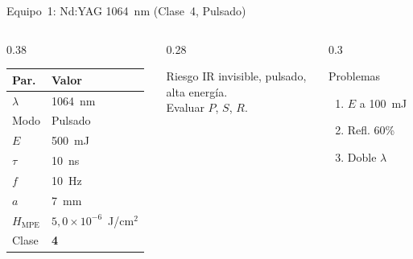 \documentclass[aspectratio=169,12pt]{beamer}
\begin{document}
\begin{frame}{Equipo~1: Nd:YAG 1064~nm (Clase~4, Pulsado)}
	\begin{columns}
		\begin{column}{0.38\textwidth}
			\centering\scriptsize
			\begin{tabular}{ll}
				\toprule
				\textbf{Par.}      & \textbf{Valor}                    \\
				\midrule
				$\lambda$          & 1064~nm                           \\
				Modo               & Pulsado                           \\
				$E$                & 500~mJ                            \\
				$\tau$             & 10~ns                             \\
				$f$                & 10~Hz                             \\
				$a$                & 7~mm                              \\
				$H_{\mathrm{MPE}}$ & $5{,}0\!\times\!10^{-6}$~J/cm$^2$ \\
				\rowcolor{aerored!15}
				Clase              & \textbf{4}                        \\
				\bottomrule
			\end{tabular}
		\end{column}
		\begin{column}{0.28\textwidth}
			\begin{alertblock}{\scriptsize Riesgo}
				\scriptsize
				IR invisible, pulsado,\\
				alta energía.\\
				Evaluar $P$, $S$, $R$.
			\end{alertblock}
		\end{column}
		\begin{column}{0.3\textwidth}
			\begin{exampleblock}{\scriptsize Problemas}
				\scriptsize
				\begin{enumerate}
					\item[P1.1] $E$ a 100~mJ
					\item[P1.2] Refl. 60\%
					\item[P1.3] Doble $\lambda$
				\end{enumerate}
			\end{exampleblock}
		\end{column}
	\end{columns}
\end{frame}
\end{document}
